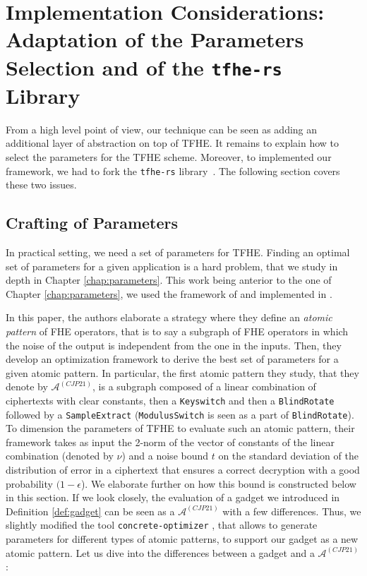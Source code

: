 \section{Implementation Considerations: Adaptation of the Parameters Selection and of the \texttt{tfhe-rs} Library}
\label{sec:p_encodings_TFHE_adaptation}


From a high level point of view, our technique can be seen as adding an additional layer of abstraction on top of \gls{TFHE}. It remains to explain how to select the parameters for the \gls{TFHE} scheme. Moreover, to implemented our framework, we had to fork the \texttt{tfhe-rs} library~\cite{tfhe-rs}. The following section covers these two issues.



\subsection{Crafting of Parameters}
\label{sec:parametrization}

In practical setting, we need a set of parameters for \gls{TFHE}. Finding an optimal set of parameters for a given application is a hard problem, that we study in depth in Chapter \ref{chap:parameters}. This work being anterior to the one of Chapter \ref{chap:parameters}, we used the framework of \cite{AC:CLOT21} and implemented in \cite{concrete-optimizer}.


In this paper, the authors elaborate a strategy where they define an \textit{atomic pattern} of \gls{FHE} operators, that is to say a subgraph of \gls{FHE} operators in which the noise of the output is independent from the one in the inputs. Then, they develop an optimization framework to derive the best set of parameters for a given atomic pattern.
%
In particular, the first atomic pattern they study, that they denote by $\mathcal{A}^{(CJP21)}$, is a subgraph composed of a linear combination of ciphertexts with clear constants, then a \texttt{Keyswitch} and then a \texttt{BlindRotate} followed by a \texttt{SampleExtract} (\texttt{ModulusSwitch} is seen as a part of \texttt{BlindRotate}). To dimension the parameters of \gls{TFHE} to evaluate such an atomic pattern, their framework takes as input the 2-norm of the vector of constants of the linear combination (denoted by $\nu$) and a noise bound $t$ on the standard deviation of the distribution of error in a ciphertext that ensures a correct decryption with a good probability $(1-\epsilon$). We elaborate further on how this bound is constructed below in this section.
%
If we look closely, the evaluation of a gadget we introduced in Definition \ref{def:gadget} can be seen as a $\mathcal{A}^{(CJP21)}$ with a few differences. Thus, we slightly modified the tool \texttt{concrete-optimizer} \cite{concrete-optimizer}, that allows to generate parameters for different types of atomic patterns, to support our gadget as a new atomic pattern. Let us dive into the differences between a gadget and a $\mathcal{A}^{(CJP21)}$:
%
